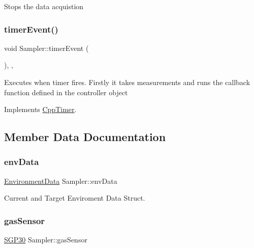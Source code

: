 Stops the data acquistion \mbox{\label{classSampler_addf333c6e247ee3a1def41260caa902a}} 
\subsubsection{\texorpdfstring{timer\+Event()}{timerEvent()}}
{\footnotesize\ttfamily void Sampler\+::timer\+Event (\begin{DoxyParamCaption}{ }\end{DoxyParamCaption})\hspace{0.3cm}{\ttfamily [inline]}, {\ttfamily [private]}, {\ttfamily [virtual]}}

Executes when timer fires. Firstly it takes measurements and runs the callback function defined in the controller object 

Implements \hyperlink{classCppTimer_ac2665403595b6aee5f581d0ebfeb886c}{Cpp\+Timer}.



\subsection{Member Data Documentation}
\mbox{\label{classSampler_a4cfbeb66e1cd18cfc66ccdb2712770f9}} 
\subsubsection{\texorpdfstring{env\+Data}{envData}}
{\footnotesize\ttfamily \hyperlink{structEnvironmentData}{Environment\+Data} Sampler\+::env\+Data\hspace{0.3cm}{\ttfamily [private]}}



Current and Target Enviroment Data Struct. 

\mbox{\label{classSampler_a4af78e46617fc8cdbc4bd14a7db5c741}} 
\subsubsection{\texorpdfstring{gas\+Sensor}{gasSensor}}
{\footnotesize\ttfamily \hyperlink{classSGP30}{S\+G\+P30} Sampler\+::gas\+Sensor\hspace{0.3cm}{\ttfamily [private]}}


